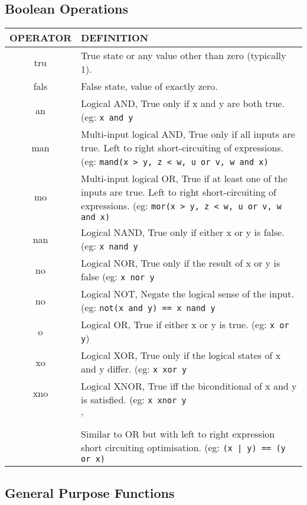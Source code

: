 \subsection{Boolean Operations}

\begin{tabular}{|c|p{}|}
\hline 
OPERATOR & DEFINITION\tabularnewline
\hline 
tru & True state or any value other than zero (typically 1).\tabularnewline
fals & False state, value of exactly zero.\tabularnewline
an & Logical AND, True only if x and y are both true. (eg: \verb'x and y'\tabularnewline
man & Multi-input logical AND, True only if all inputs are true. Left to
right short-circuiting of expressions. (eg: \verb'mand(x > y, z < w, u or v, w and x)'\tabularnewline
mo & Multi-input logical OR, True if at least one of the inputs are true.
Left to right short-circuiting of expressions. (eg: \verb'mor(x > y, z < w, u or v, w and x)'\tabularnewline
nan & Logical NAND, True only if either x or y is false. (eg: \verb'x nand y'\tabularnewline
no & Logical NOR, True only if the result of x or y is false (eg: \verb'x nor y'\tabularnewline
no & Logical NOT, Negate the logical sense of the input. (eg: \verb'not(x and y) == x nand y'\tabularnewline
o & Logical OR, True if either x or y is true. (eg: \verb'x or y')\tabularnewline
xo & Logical XOR, True only if the logical states of x and y differ. (eg:
\verb'x xor y'\tabularnewline
xno & Logical XNOR, True iff the biconditional of x and y is satisfied.
(eg: \verb'x xnor y'\tabularnewline
 & '\tabularnewline
 & Similar to OR but with left to right expression short circuiting optimisation.
(eg: \verb'(x | y) == (y or x)'\tabularnewline
\hline 
\end{tabular}

\subsection{General Purpose Functions}

